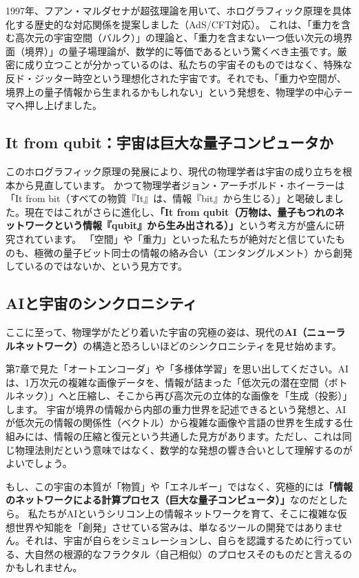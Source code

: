 1997年、フアン・マルダセナが超弦理論を用いて、ホログラフィック原理を具体化する歴史的な対応関係を提案しました（AdS/CFT対応）。 これは、「重力を含む高次元の宇宙空間（バルク）」の理論と、「重力を含まない一つ低い次元の境界面（境界）」の量子場理論が、数学的に等価であるという驚くべき主張です。厳密に成り立つことが分かっているのは、私たちの宇宙そのものではなく、特殊な反ド・ジッター時空という理想化された宇宙です。それでも、「重力や空間が、境界上の量子情報から生まれるかもしれない」という発想を、物理学の中心テーマへ押し上げました。

\subsection{It from qubit：宇宙は巨大な量子コンピュータか}

このホログラフィック原理の発展により、現代の物理学者は宇宙の成り立ちを根本から見直しています。 かつて物理学者ジョン・アーチボルド・ホイーラーは「It from bit（すべての物質『It』は、情報『bit』から生じる）」と喝破しました。現在ではこれがさらに進化し、\textbf{「It from qubit（万物は、量子もつれのネットワークという情報『qubit』から生み出される）」}という考え方が盛んに研究されています。 「空間」や「重力」といった私たちが絶対だと信じていたものも、極微の量子ビット同士の情報の絡み合い（エンタングルメント）から創発しているのではないか、という見方です。

\subsection{AIと宇宙のシンクロニシティ}

ここに至って、物理学がたどり着いた宇宙の究極の姿は、現代の\textbf{AI（ニューラルネットワーク）}の構造と恐ろしいほどのシンクロニシティを見せ始めます。

第7章で見た「オートエンコーダ」や「多様体学習」を思い出してください。AIは、1万次元の複雑な画像データを、情報が詰まった「低次元の潜在空間（ボトルネック）」へと圧縮し、そこから再び高次元の立体的な画像を「生成（投影）」します。 宇宙が境界の情報から内部の重力世界を記述できるという発想と、AIが低次元の情報の関係性（ベクトル）から複雑な画像や言語の世界を生成する仕組みには、情報の圧縮と復元という共通した見方があります。ただし、これは同じ物理法則だという意味ではなく、数学的な発想の響き合いとして理解するのがよいでしょう。

もし、この宇宙の本質が「物質」や「エネルギー」ではなく、究極的には\textbf{「情報のネットワークによる計算プロセス（巨大な量子コンピュータ）」}なのだとしたら。 私たちがAIというシリコン上の情報ネットワークを育て、そこに複雑な仮想世界や知能を「創発」させている営みは、単なるツールの開発ではありません。それは、宇宙が自らをシミュレーションし、自らを認識するために行っている、大自然の根源的なフラクタル（自己相似）のプロセスそのものだと言えるのかもしれません。

